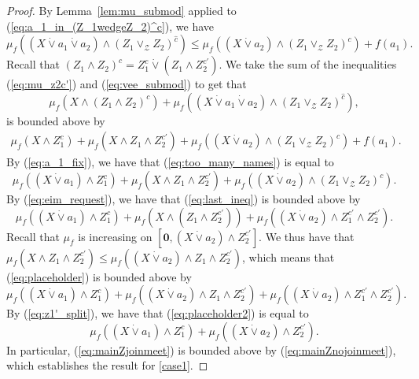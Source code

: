 \documentclass[a4paper,11pt,reqno]{article}
\theoremstyle{definition}
\newcommand{\zero}{{\mathbf{0}}}
\begin{document}
\begin{proof}
By Lemma~\ref{lem:mu_submod} applied to (\ref{eq:a_1_in_(Z_1wedgeZ_2)^c}), we have 
\begin{equation}\label{eq:vee_submod}
    \mu_f((X\dot\vee a_1\dot\vee a_2)\wedge(Z_1\vee_\mathcal{Z} Z_2)^{\hat{c}})\leq\mu_f((X\dot\vee a_2)\wedge(Z_1\vee_\mathcal{Z} Z_2)^c)+f(a_1).
\end{equation}
Recall that $(Z_1\wedge Z_2)^c=Z_1^c\dot\vee(Z_1\wedge Z_2^{c'})$. We take the sum of the inequalities (\ref{eq:mu_z2c'}) and (\ref{eq:vee_submod}) to get that
\begin{equation}\label{eq:mainZjoinmeet}
    \mu_f(X\wedge (Z_1\wedge Z_2)^c)+\mu_f((X\dot\vee a_1\dot\vee a_2)\wedge (Z_1\vee_\mathcal{Z} Z_2)^{\hat{c}}),
\end{equation}
is bounded above by
\begin{align}\label{eq:too_many_names}
    \mu_f(X\wedge Z_1^c)+\mu_f(X\wedge Z_1\wedge Z_2^{c'})+\mu_f((X\dot\vee a_2)\wedge(Z_1\vee_\mathcal{Z} Z_2)^c)+f(a_1).
\end{align}
By (\ref{eq:a_1_fix}), we have that (\ref{eq:too_many_names}) is equal to
\begin{equation}\label{eq:last_ineq}
    \mu_f((X\dot\vee a_1)\wedge Z_1^c)+\mu_f(X\wedge Z_1\wedge Z_2^{c'})+\mu_f((X\dot\vee a_2)\wedge(Z_1\vee_\mathcal{Z} Z_2)^c).
\end{equation}
By (\ref{eq:eim_request}), we have that (\ref{eq:last_ineq}) is bounded above by
\begin{equation}\label{eq:placeholder}
    \mu_f((X\dot\vee a_1)\wedge Z_1^c)+\mu_f(X\wedge(Z_1\wedge Z_2^{c'}))+\mu_f((X\dot\vee a_2)\wedge Z_1^{c'}\wedge Z_2^{c'}).
\end{equation}
Recall that $\mu_f$ is increasing on $[\zero,(X\dot\vee a_2)\wedge Z_2^{c'}]$. We thus have that $\mu_f(X\wedge Z_1\wedge Z_2^{c'})\leq\mu_f((X\dot\vee a_2)\wedge Z_1\wedge Z_2^{c'})$, which means that (\ref{eq:placeholder}) is bounded above by
\begin{equation}\label{eq:placeholder2}
    \mu_f((X\dot\vee a_1)\wedge Z_1^c)+\mu_f((X\dot\vee a_2)\wedge Z_1\wedge Z_2^{c'})+\mu_f((X\dot\vee a_2)\wedge Z_1^{c'}\wedge Z_2^{c'}).
\end{equation}
By (\ref{eq:z1'_split}), we have that (\ref{eq:placeholder2}) is equal to
\begin{equation}\label{eq:mainZnojoinmeet}
    \mu_f((X\dot\vee a_1)\wedge Z_1^c)+\mu_f((X\dot\vee a_2)\wedge Z_2^{c'}).
\end{equation}
In particular, (\ref{eq:mainZjoinmeet}) is bounded above by (\ref{eq:mainZnojoinmeet}), which establishes the result for \ref{case1}.


\end{proof}
\end{document}
